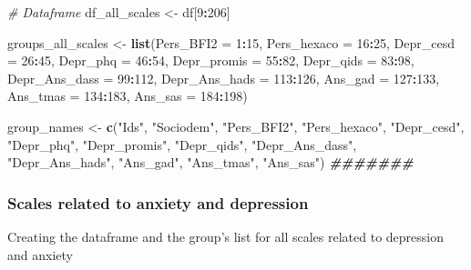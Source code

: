 \documentclass[
]{article}
\newenvironment{Shaded}{\begin{snugshade}}{\end{snugshade}}
\newcommand{\AttributeTok}[1]{\textcolor[rgb]{0.13,0.29,0.53}{#1}}
\newcommand{\CommentTok}[1]{\textcolor[rgb]{0.56,0.35,0.01}{\textit{#1}}}
\newcommand{\DecValTok}[1]{\textcolor[rgb]{0.00,0.00,0.81}{#1}}
\newcommand{\DocumentationTok}[1]{\textcolor[rgb]{0.56,0.35,0.01}{\textbf{\textit{#1}}}}
\newcommand{\FunctionTok}[1]{\textcolor[rgb]{0.13,0.29,0.53}{\textbf{#1}}}
\newcommand{\NormalTok}[1]{#1}
\newcommand{\OtherTok}[1]{\textcolor[rgb]{0.56,0.35,0.01}{#1}}
\newcommand{\SpecialCharTok}[1]{\textcolor[rgb]{0.81,0.36,0.00}{\textbf{#1}}}
\newcommand{\StringTok}[1]{\textcolor[rgb]{0.31,0.60,0.02}{#1}}
\begin{document}
\begin{Shaded}
\begin{Highlighting}[]
\CommentTok{\# Dataframe}
\NormalTok{df\_all\_scales }\OtherTok{\textless{}{-}}\NormalTok{ df[}\DecValTok{9}\SpecialCharTok{:}\DecValTok{206}\NormalTok{]}

\NormalTok{groups\_all\_scales }\OtherTok{\textless{}{-}} \FunctionTok{list}\NormalTok{(}\AttributeTok{Pers\_BFI2 =} \DecValTok{1}\SpecialCharTok{:}\DecValTok{15}\NormalTok{, }\AttributeTok{Pers\_hexaco =} \DecValTok{16}\SpecialCharTok{:}\DecValTok{25}\NormalTok{, }\AttributeTok{Depr\_cesd =} \DecValTok{26}\SpecialCharTok{:}\DecValTok{45}\NormalTok{, }\AttributeTok{Depr\_phq =} \DecValTok{46}\SpecialCharTok{:}\DecValTok{54}\NormalTok{, }\AttributeTok{Depr\_promis =} \DecValTok{55}\SpecialCharTok{:}\DecValTok{82}\NormalTok{, }\AttributeTok{Depr\_qids =} \DecValTok{83}\SpecialCharTok{:}\DecValTok{98}\NormalTok{, }\AttributeTok{Depr\_Ans\_dass =} \DecValTok{99}\SpecialCharTok{:}\DecValTok{112}\NormalTok{, }\AttributeTok{Depr\_Ans\_hads =} \DecValTok{113}\SpecialCharTok{:}\DecValTok{126}\NormalTok{, }\AttributeTok{Ans\_gad =} \DecValTok{127}\SpecialCharTok{:}\DecValTok{133}\NormalTok{, }\AttributeTok{Ans\_tmas =} \DecValTok{134}\SpecialCharTok{:}\DecValTok{183}\NormalTok{, }\AttributeTok{Ans\_sas =} \DecValTok{184}\SpecialCharTok{:}\DecValTok{198}\NormalTok{)}

\NormalTok{group\_names }\OtherTok{\textless{}{-}} \FunctionTok{c}\NormalTok{(}\StringTok{"Ids"}\NormalTok{, }\StringTok{"Sociodem"}\NormalTok{, }\StringTok{"Pers\_BFI2"}\NormalTok{, }\StringTok{"Pers\_hexaco"}\NormalTok{, }\StringTok{"Depr\_cesd"}\NormalTok{, }\StringTok{"Depr\_phq"}\NormalTok{, }\StringTok{"Depr\_promis"}\NormalTok{, }\StringTok{"Depr\_qids"}\NormalTok{, }\StringTok{"Depr\_Ans\_dass"}\NormalTok{, }\StringTok{"Depr\_Ans\_hads"}\NormalTok{, }\StringTok{"Ans\_gad"}\NormalTok{, }\StringTok{"Ans\_tmas"}\NormalTok{, }\StringTok{"Ans\_sas"}\NormalTok{)}
\DocumentationTok{\#\#\#\#\#\#\#}
\end{Highlighting}
\end{Shaded}

\subsubsection{Scales related to anxiety and
depression}\label{scales-related-to-anxiety-and-depression}

Creating the dataframe and the group's list for all scales related to
depression and anxiety
\end{document}
